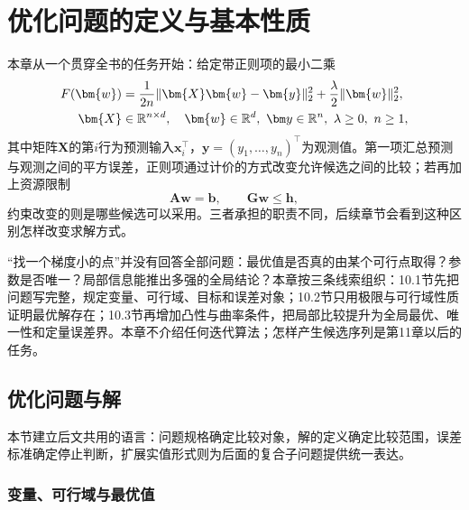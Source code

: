 \chapter{优化问题的定义与基本性质}
\label{chap:optimization}

本章从一个贯穿全书的任务开始：给定带正则项的最小二乘
\begin{equation}
\begin{aligned}
  F(\bm{w})
  &=\frac{1}{2n}\lVert \bm{X}\bm{w}-\bm{y}\rVert_2^2
   +\frac{\lambda}{2}\lVert\bm{w}\rVert_2^2,\\
  \bm{X}&\in\mathbb{R}^{n\times d},\quad
  \bm{w}\in\mathbb R^d,\ \bm y\in\mathbb R^n,\
  \lambda\geq 0,\ n\geq1,
\end{aligned}
  \label{eq:opt-regularized-least-squares}
\begingroup
\makeatletter
\let\label\ltx@label
\label{eq:prelim-regularized-least-squares}
\endgroup
\end{equation}
其中矩阵$\bm X$的第$i$行为预测输入$\bm x_i^\top$，$\bm y=(y_1,\ldots,y_n)^\top$为观测值。第一项汇总预测与观测之间的平方误差，正则项通过计价的方式改变允许候选之间的比较；若再加上资源限制
\begin{equation}
  \bm{A}\bm{w}=\bm{b},\qquad
  \bm{G}\bm{w}\leq\bm{h},
  \label{eq:opt-linear-resource-constraints}
\end{equation}
约束改变的则是哪些候选可以采用。三者承担的职责不同，后续章节会看到这种区别怎样改变求解方式。

“找一个梯度小的点”并没有回答全部问题：最优值是否真的由某个可行点取得？参数是否唯一？局部信息能推出多强的全局结论？本章按三条线索组织：10.1节先把问题写完整，规定变量、可行域、目标和误差对象；10.2节只用极限与可行域性质证明最优解存在；10.3节再增加凸性与曲率条件，把局部比较提升为全局最优、唯一性和定量误差界。本章不介绍任何迭代算法；怎样产生候选序列是第11章以后的任务。

\section{优化问题与解}
\label{sec:opt-problem-and-solutions}
\label{sec:opt-error-objects}

本节建立后文共用的语言：问题规格确定比较对象，解的定义确定比较范围，误差标准确定停止判断，扩展实值形式则为后面的复合子问题提供统一表达。

\subsection{变量、可行域与最优值}

